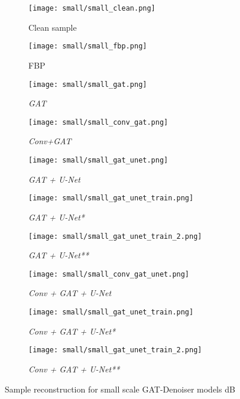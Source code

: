 \begin{figure}[H]
  \captionsetup[subfigure]{justification=centering}
  \centering
  \begin{subfigure}[t]{0.16\textwidth}
    \texttt{[image: small/small\_clean.png]}
    \caption{Clean sample}
  \end{subfigure} \hfill
  \begin{subfigure}[t]{0.16\textwidth}
    \texttt{[image: small/small\_fbp.png]}
    \caption{FBP}
  \end{subfigure} \hfill
  \begin{subfigure}[t]{0.16\textwidth}
    \texttt{[image: small/small\_gat.png]}
    \caption{\textit{GAT}}
  \end{subfigure} \hfill
  \begin{subfigure}[t]{0.16\textwidth}
    \texttt{[image: small/small\_conv\_gat.png]}
    \caption{\textit{Conv+GAT}}
  \end{subfigure} \hfill
  \begin{subfigure}[t]{0.16\textwidth}
    \texttt{[image: small/small\_gat\_unet.png]}
    \caption{\textit{GAT + U-Net}}
  \end{subfigure}

  \begin{subfigure}[t]{0.16\textwidth}
    \texttt{[image: small/small\_gat\_unet\_train.png]}
    \caption{\textit{GAT + U-Net*}}
  \end{subfigure} \hfill
  \begin{subfigure}[t]{0.16\textwidth}
    \texttt{[image: small/small\_gat\_unet\_train\_2.png]}
    \caption{\textit{GAT + U-Net**}}
  \end{subfigure} \hfill
  \begin{subfigure}[t]{0.16\textwidth}
    \texttt{[image: small/small\_conv\_gat\_unet.png]}
    \caption{\textit{Conv + GAT + U-Net}}
  \end{subfigure} \hfill
  \begin{subfigure}[t]{0.16\textwidth}
    \texttt{[image: small/small\_gat\_unet\_train.png]}
    \caption{\textit{Conv + GAT + U-Net*}}
  \end{subfigure} \hfill
  \begin{subfigure}[t]{0.16\textwidth}
    \texttt{[image: small/small\_gat\_unet\_train\_2.png]}
    \caption{\textit{Conv + GAT + U-Net**}}
  \end{subfigure}
  \caption{Sample reconstruction for small scale GAT-Denoiser models  dB}
  \label{fig:small_components_overview}
\end{figure}

